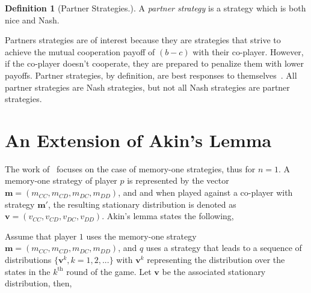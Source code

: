 \documentclass{article}
\theoremstyle{definition}
\newtheorem{definition}{Definition}[section]
\begin{document}
\begin{definition}[Partner Strategies.]
A \textit{partner strategy} is a strategy which is both nice and Nash.
\end{definition}

Partners strategies are of interest because they are strategies that strive to
achieve the mutual cooperation payoff of $(b - c)$ with their co-player.
However, if the co-player doesn't cooperate, they are prepared to penalize them
with lower payoffs. Partner strategies, by definition, are best responses to
themselves~\citep{Hilbe:GEB:2015}. All partner
strategies are Nash strategies, but not all Nash strategies are partner
strategies.


\section{An Extension of Akin's Lemma}

The work of~\citep{akin:EGADS:2016} focuses on the case of
memory-one strategies, thus for $n=1$. A memory-one strategy of player $p$ is
represented by the vector $\mathbf{m} = (m_{CC}, m_{CD}, m_{DC}, m_{DD})$, and and when
played against a co-player with strategy $\mathbf{m}'$, the resulting stationary
distribution is denoted as $\mathbf{v} = (v_{CC}, v_{CD}, v_{DC}, v_{DD})$. Akin's lemma
states the following,

Assume that player \(1\) uses the memory-one strategy \(\mathbf{m}=(m_{CC}, m_{CD},
m_{DC}, m_{DD})\), and \(q\) uses a strategy that leads to a sequence of distributions
\(\{\mathbf{v}^{k}, k = 1, 2, ...\}\) with \(\mathbf{v}^{k}\) representing the
distribution over the states in the \(k^{\text{th}}\) round of the game. Let
\(\mathbf{v}\) be the associated stationary distribution, then,
\end{document}

